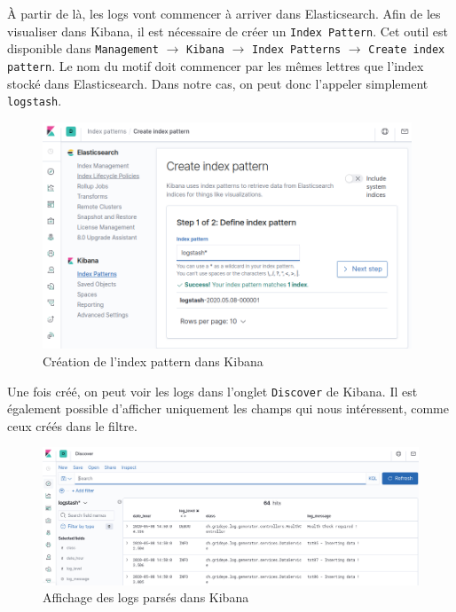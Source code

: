 \documentclass[paper=a4, fontsize=11pt]{scrartcl}
\begin{document}
À partir de là, les logs vont commencer à arriver dans Elasticsearch. Afin de les visualiser dans Kibana, il est nécessaire de créer un \verb,Index Pattern,. Cet outil est disponible dans \verb,Management, $\rightarrow$ \verb,Kibana, $\rightarrow$ \verb,Index Patterns, $\rightarrow$ \verb,Create index pattern,. Le nom du motif doit commencer par les mêmes lettres que l'index stocké dans Elasticsearch. Dans notre cas, on peut donc l'appeler simplement \verb,logstash,.
\begin{figure}[H]
    \centering
    \includegraphics[width=11cm]{img/screenshots/kib_create_index_pattern.png}
    \caption{Création de l'index pattern dans Kibana}
    \label{f-kibCreateIndexPattern}
\end{figure}
Une fois créé, on peut voir les logs dans l'onglet \verb,Discover, de Kibana. Il est également possible d'afficher uniquement les champs qui nous intéressent, comme ceux créés dans le filtre.
\begin{figure}[H]
    \centering
    \includegraphics[width=18cm]{img/screenshots/kib_logs_arrived.png}
    \caption{Affichage des logs parsés dans Kibana}
    \label{f-kibLogsArrived}
\end{figure}
\end{document}
